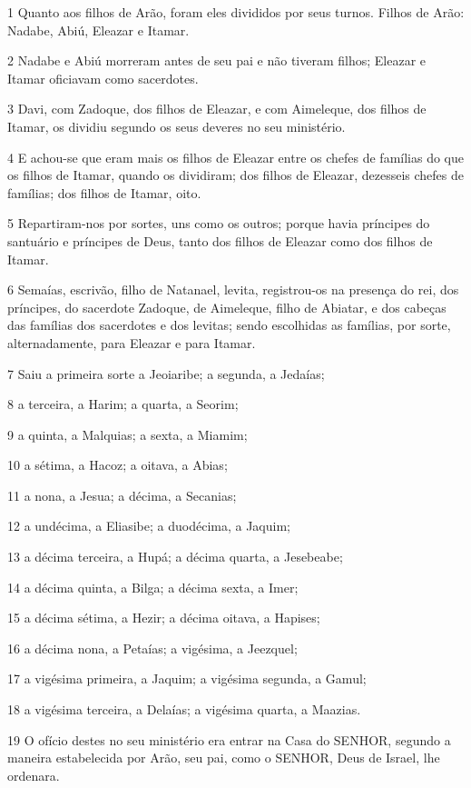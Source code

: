 \par 1 Quanto aos filhos de Arão, foram eles divididos por seus turnos. Filhos de Arão: Nadabe, Abiú, Eleazar e Itamar.
\par 2 Nadabe e Abiú morreram antes de seu pai e não tiveram filhos; Eleazar e Itamar oficiavam como sacerdotes.
\par 3 Davi, com Zadoque, dos filhos de Eleazar, e com Aimeleque, dos filhos de Itamar, os dividiu segundo os seus deveres no seu ministério.
\par 4 E achou-se que eram mais os filhos de Eleazar entre os chefes de famílias do que os filhos de Itamar, quando os dividiram; dos filhos de Eleazar, dezesseis chefes de famílias; dos filhos de Itamar, oito.
\par 5 Repartiram-nos por sortes, uns como os outros; porque havia príncipes do santuário e príncipes de Deus, tanto dos filhos de Eleazar como dos filhos de Itamar.
\par 6 Semaías, escrivão, filho de Natanael, levita, registrou-os na presença do rei, dos príncipes, do sacerdote Zadoque, de Aimeleque, filho de Abiatar, e dos cabeças das famílias dos sacerdotes e dos levitas; sendo escolhidas as famílias, por sorte, alternadamente, para Eleazar e para Itamar.
\par 7 Saiu a primeira sorte a Jeoiaribe; a segunda, a Jedaías;
\par 8 a terceira, a Harim; a quarta, a Seorim;
\par 9 a quinta, a Malquias; a sexta, a Miamim;
\par 10 a sétima, a Hacoz; a oitava, a Abias;
\par 11 a nona, a Jesua; a décima, a Secanias;
\par 12 a undécima, a Eliasibe; a duodécima, a Jaquim;
\par 13 a décima terceira, a Hupá; a décima quarta, a Jesebeabe;
\par 14 a décima quinta, a Bilga; a décima sexta, a Imer;
\par 15 a décima sétima, a Hezir; a décima oitava, a Hapises;
\par 16 a décima nona, a Petaías; a vigésima, a Jeezquel;
\par 17 a vigésima primeira, a Jaquim; a vigésima segunda, a Gamul;
\par 18 a vigésima terceira, a Delaías; a vigésima quarta, a Maazias.
\par 19 O ofício destes no seu ministério era entrar na Casa do SENHOR, segundo a maneira estabelecida por Arão, seu pai, como o SENHOR, Deus de Israel, lhe ordenara.
